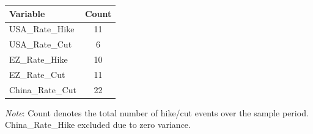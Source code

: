 \begin{tabular}{lc}
  \toprule
  \textbf{Variable} & \textbf{Count} \\ 
  \midrule
  USA\_Rate\_Hike & 11 \\ 
  USA\_Rate\_Cut & 6 \\ 
  EZ\_Rate\_Hike & 10 \\ 
  EZ\_Rate\_Cut & 11 \\ 
  China\_Rate\_Cut & 22 \\ 
  \bottomrule
\end{tabular}
\par\vspace{4pt}
\begin{minipage}{\linewidth}
  \footnotesize \textit{Note}: Count denotes the total number of hike/cut events over the sample period. China\_Rate\_Hike excluded due to zero variance.
\end{minipage}